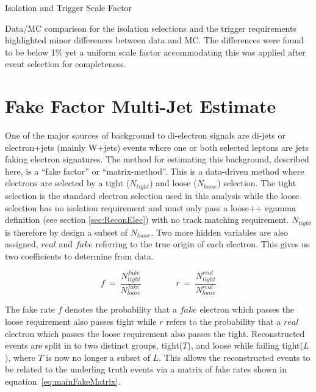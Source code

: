    {\bf\raggedright Isolation and Trigger Scale Factor}

   {\raggedright Data/MC comparison for the isolation selections and the trigger requirements highlighted minor differences between data and MC. The differences were found to be below 1\% yet a uniform scale factor accommodating this was applied after event selection for completeness.}




\section{Fake Factor Multi-Jet Estimate}
   \label{sec:FFmethod}

One of the major sources of background to di-electron signals are di-jets or electron+jets (mainly W+jets) events where one or both selected leptons are jets faking electron signatures. The method for estimating this background, described here, is a ``fake factor'' or ``matrix-method''. This is a data-driven method where electrons are selected by a tight ($N_{tight}$) and loose ($N_{loose}$) selection. The tight selection is the standard electron selection used in this analysis while the loose selection has no isolation requirement and must only pass a loose++ egamma definition (see section \ref{sec:ReconElec}) with no track matching requirement. $N_{tight}$ is therefore by design a subset of $N_{loose}$. Two more hidden variables are also assigned, $real$ and $fake$ referring to the true origin of each electron. This gives us two coefficients to determine from data.

\begin{equation} \label{eq:fakeRate}
   f~=~\frac{N^{fake}_{tight}}{N^{fake}_{loose}} \qquad \qquad r~=~\frac{N^{real}_{tight}}{N^{real}_{loose}}
\end{equation}

The fake rate $f$ denotes the probability that a $fake$ electron which passes the loose requirement also passes tight while $r$ refers to the probability that a $real$ electron which passes the loose requirement also passes the tight.
Reconstructed events are split in to two distinct groups, tight($T$), and loose while failing tight($L$), where $T$ is now no longer a subset of $L$. This allows the reconstructed events to be related to the underling truth events via a matrix of fake rates shown in equation~\ref{eq:mainFakeMatrix}.

